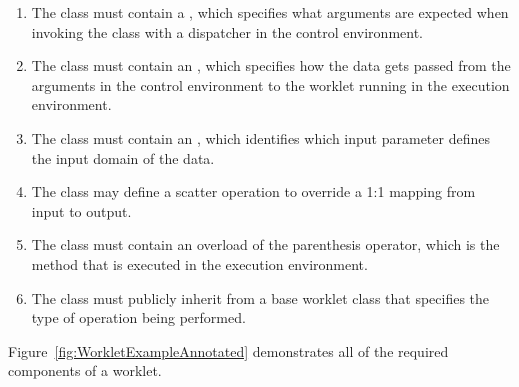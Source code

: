 \begin{enumerate}
\item The class must contain a \controlsignature {}, which
  specifies what arguments are expected when invoking the class with a
  dispatcher in the control environment.
\item The class must contain an \executionsignature {},
  which specifies how the data gets passed from the arguments in the
  control environment to the worklet running in the execution environment.
\item The class must contain an  {}, which
  identifies which input parameter defines the input domain of the data.
\item The class may define a scatter operation to override a 1:1 mapping
  from input to output.
\item The class must contain an overload of the parenthesis operator, which
  is the method that is executed in the execution environment.
\item The class must publicly inherit from a base worklet class that
  specifies the type of operation being performed.
\end{enumerate}

Figure~\ref{fig:WorkletExampleAnnotated} demonstrates all of the required
components of a worklet.




